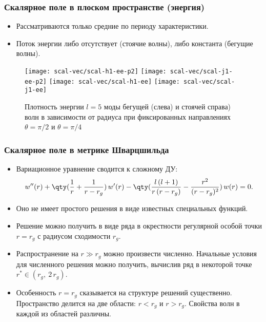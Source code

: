 \documentclass[compress, 9pt]{beamer}
\begin{document}
    \begin{frame}\frametitle{Скалярное поле в плоском пространстве (энергия)}

        \begin{itemize}\justifying
            \item Рассматриваются только средние по периоду характеристики.
            \item Поток энергии либо отсутствует (стоячие волны), либо константа (бегущие волны).
        \end{itemize}
        \begin{figure}[h]
            \centering
            \texttt{[image: scal-vec/scal-h1-ee-p2]}\hspace{8pt}%
            \texttt{[image: scal-vec/scal-j1-ee-p2]}\hspace{8pt}%
            \texttt{[image: scal-vec/scal-h1-ee]}\hspace{8pt}%
            \texttt{[image: scal-vec/scal-j1-ee]}\hspace{8pt}%
            \caption[]{Плотность энергии $l=5$ моды бегущей (слева) и стоячей справа) волн в зависимости от радиуса при фиксированных направлениях $\theta = \pi/2$ и $\theta = \pi/4$}%
        \end{figure}

    \end{frame}

    \begin{frame}\frametitle{Скалярное поле в метрике Шварцшильда}

        \begin{itemize}\justifying
            \item Вариационное уравнение сводится к сложному ДУ:
            \begin{equation*}
                w''(r) + \qty(\frac{1}{r} + \frac{1}{r - r_g})\, w'(r) - \qty(\frac{l\,(l+1)}{r\, (r-r_g)} - \frac{r^2}{(r-r_g)^2})\, w(r) = 0.
            \end{equation*}
            \item Оно не имеет простого решения в виде известных специальных функций.
            \item Решение можно получить в виде ряда в окрестности регулярной особой точки \cite{whittaker_watson_1, fedoryuk_de} $r = r_g$ с радиусом сходимости $r_g$.
            \item Распространение на $r \gg r_g$ можно произвести численно. Начальные условия для численного решения можно получить, вычислив ряд в некоторой точке $r^* \in (r_g,\ 2\, r_g)$.
            \item Особенность $r = r_g$ сказывается на структуре решений существенно. Пространство делится на две области: $r < r_g$ и $r > r_g$. Свойства волн в каждой из областей различны.
        \end{itemize}

    \end{frame}
\end{document}

